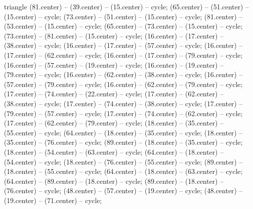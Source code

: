 {\begin{pgfonlayer}{triangle}
 (81.center) -- (39.center) -- (15.center) -- cycle; 
 (65.center) -- (51.center) -- (15.center) -- cycle; 
 (73.center) -- (51.center) -- (15.center) -- cycle; 
 (81.center) -- (53.center) -- (15.center) -- cycle; 
 (65.center) -- (73.center) -- (15.center) -- cycle; 
 (73.center) -- (81.center) -- (15.center) -- cycle; 
 (16.center) -- (17.center) -- (38.center) -- cycle; 
 (16.center) -- (17.center) -- (57.center) -- cycle; 
 (16.center) -- (17.center) -- (62.center) -- cycle; 
 (16.center) -- (17.center) -- (79.center) -- cycle; 
 (16.center) -- (57.center) -- (19.center) -- cycle; 
 (16.center) -- (19.center) -- (79.center) -- cycle; 
 (16.center) -- (62.center) -- (38.center) -- cycle; 
 (16.center) -- (57.center) -- (79.center) -- cycle; 
 (16.center) -- (62.center) -- (79.center) -- cycle; 
 (17.center) -- (74.center) -- (22.center) -- cycle; 
 (17.center) -- (62.center) -- (38.center) -- cycle; 
 (17.center) -- (74.center) -- (38.center) -- cycle; 
 (17.center) -- (79.center) -- (57.center) -- cycle; 
 (17.center) -- (74.center) -- (62.center) -- cycle; 
 (17.center) -- (62.center) -- (79.center) -- cycle; 
 (18.center) -- (35.center) -- (55.center) -- cycle; 
 (64.center) -- (18.center) -- (35.center) -- cycle; 
 (18.center) -- (35.center) -- (76.center) -- cycle; 
 (89.center) -- (18.center) -- (35.center) -- cycle; 
 (18.center) -- (54.center) -- (63.center) -- cycle; 
 (64.center) -- (18.center) -- (54.center) -- cycle; 
 (18.center) -- (76.center) -- (55.center) -- cycle; 
 (89.center) -- (18.center) -- (55.center) -- cycle; 
 (64.center) -- (18.center) -- (63.center) -- cycle; 
 (64.center) -- (89.center) -- (18.center) -- cycle; 
 (89.center) -- (18.center) -- (76.center) -- cycle; 
 (48.center) -- (57.center) -- (19.center) -- cycle; 
 (48.center) -- (19.center) -- (71.center) -- cycle; 

\end{pgfonlayer}}
